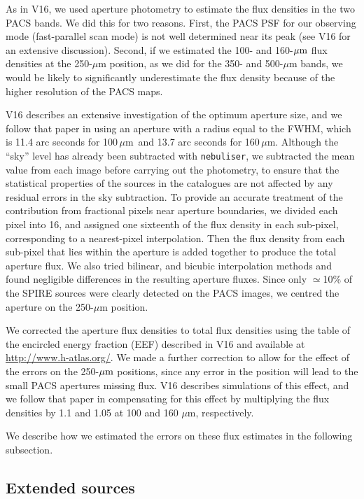\documentclass[a4paper,fleqn,usenatbib, twocolumn]{aastex61}
\def\mic{\,$\mu $m}
\begin{document}
As in V16, we used aperture photometry to estimate the flux densities
in the two PACS bands. We did this for two reasons. First, the PACS
PSF for our observing mode (fast-parallel scan mode) is not well
determined near its peak (see V16 for an extensive
discussion). Second, if we estimated the 100- and 160-$\mbox{$\mu$m}$ flux
densities at the 250-$\mu$m position, as we did for the 350- and
500-$\mu$m bands, we would be likely to significantly underestimate
the flux density because of the higher resolution of the PACS maps.

V16 describes an extensive investigation of the optimum aperture size,
and we follow that paper in using an aperture with a radius equal to
the FWHM, which is 11.4 arc seconds for 100\mic\ and 13.7 arc seconds
for 160\mic. Although the ``sky'' level has already been subtracted with
{\tt nebuliser}, we subtracted the mean value from each image before
carrying out the photometry,
to ensure that the statistical properties of the sources in the catalogues
are not affected by any residual errors in the sky subtraction.
To
provide an accurate treatment of the contribution from fractional
pixels near aperture boundaries, we divided each pixel into 16, and
assigned one sixteenth of the flux density in each sub-pixel,
corresponding to a nearest-pixel interpolation. Then the flux density
from each sub-pixel that lies within the aperture is added together to
produce the total aperture flux.  We also tried bilinear, and bicubic
interpolation methods and found negligible differences in the
resulting aperture fluxes.  Since only $\simeq$10\% of the SPIRE
sources were clearly detected on the PACS images, we centred the
aperture on the 250-$\mu$m position.

We corrected the aperture flux densities to total flux densities using
the table of the encircled energy fraction (EEF) described in V16 and
available at \url{http://www.h-atlas.org/}.  We made a further
correction to allow for the effect of the errors on the 250-$\mbox{$\mu$m}$
positions, since any error in the position will lead to the small PACS
apertures missing flux. V16 describes simulations of this effect, and
we follow that paper in compensating for this effect by multiplying
the flux densities by 1.1 and 1.05 at 100 and 160 $\mu$m,
respectively.

We describe how we estimated the errors on these flux estimates in the
following subsection.

\subsection{Extended sources} 
\end{document}
